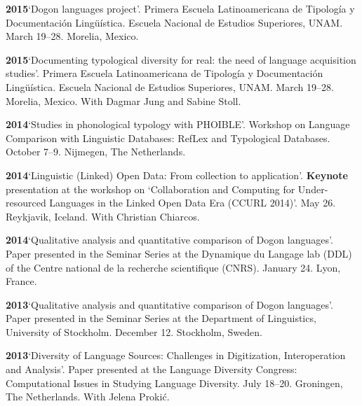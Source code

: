 \documentclass[11pt]{article}
\newcommand{\hangpara}{
 \setlength{\parindent}{0in} %
 \hangindent=0.42in %
}
\begin{document}

\vskip 6pt
\hangpara
{\bf 2015}\hspace{1ex}`Dogon languages project'. Primera Escuela Latinoamericana de Tipolog{\'i}a y Documentaci{\'o}n Ling{\"u}{\'i}stica. Escuela Nacional de Estudios Superiores, UNAM. March 19--28. Morelia, Mexico.

\vskip 6pt
\hangpara
{\bf 2015}\hspace{1ex}`Documenting typological diversity for real: the need of language acquisition studies'.  Primera Escuela Latinoamericana de Tipolog{\'i}a y Documentaci{\'o}n Ling{\"u}{\'i}stica. Escuela Nacional de Estudios Superiores, UNAM. March 19--28. Morelia, Mexico. With Dagmar Jung and Sabine Stoll.

\vskip 6pt
\hangpara
{\bf 2014}\hspace{1ex}`Studies in phonological typology with PHOIBLE'. Workshop on Language Comparison with Linguistic Databases: RefLex and Typological Databases. October 7--9. Nijmegen, The Netherlands.

\vskip 6pt
\hangpara
{\bf 2014}\hspace{1ex}`Linguistic (Linked) Open Data: From collection to application'. \textbf{Keynote} presentation at the workshop on `Collaboration and Computing for Under-resourced Languages in the Linked Open Data Era (CCURL 2014)'. May 26. Reykjavik, Iceland. With Christian Chiarcos.

\vskip 6pt
\hangpara
{\bf 2014}\hspace{1ex}`Qualitative analysis and quantitative comparison of Dogon languages'. Paper presented in the Seminar Series at the Dynamique du Langage lab (DDL) of the Centre national de la recherche scientifique (CNRS). January 24. Lyon, France.

\vskip 6pt
\hangpara
{\bf 2013}\hspace{1ex}`Qualitative analysis and quantitative comparison of Dogon languages'. Paper presented in the Seminar Series at the Department of Linguistics, University of Stockholm. December 12. Stockholm, Sweden.

\vskip 6pt
\hangpara
{\bf 2013}\hspace{1ex}`Diversity of Language Sources: Challenges in Digitization, Interoperation and Analysis'. Paper presented at the Language Diversity Congress: Computational Issues in Studying Language Diversity. July 18--20. Groningen, The Netherlands. With Jelena Proki{\'c}.
\end{document}
